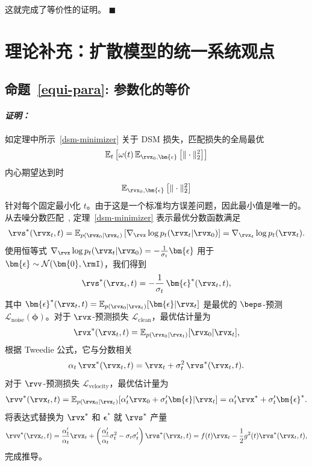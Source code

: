 这就完成了等价性的证明。
\hfill$\blacksquare$


\section{理论补充：扩散模型的统一系统观点}\label{app-sec:equiv-para}

\subsection{命题~\ref{equi-para}: 参数化的等价}

\paragraph{\textit{证明：}}
如定理中所示~\ref{dsm-minimizer} 关于 DSM 损失，匹配损失的全局最优
\[
\mathbb{E}_t\left[\omega(t)\,\mathbb{E}_{\rvx_0,\bm{\epsilon}}\left[\|\cdot\|_2^2\right]\right]
\]
内心期望达到时
\[
\mathbb{E}_{\rvx_0,\bm{\epsilon}}\left[\|\cdot\|_2^2\right]
\]
针对每个固定最小化 $t$。由于这是一个标准均方误差问题，因此最小值是唯一的。从去噪分数匹配~\citep{vincent2011connection}, 定理~\ref{dsm-minimizer} 表示最优分数函数满足
\begin{align*}
    \rvs^*(\rvx_t,t) = \mathbb{E}_{p(\rvx_0|\rvx_t)}\left[\nabla_{\rvx}\log p_t(\rvx_t|\rvx_0)\right] = \nabla_{\rvx_t} \log p_t(\rvx_t).
\end{align*}
使用恒等式 $\nabla_{\rvx}\log p_t(\rvx_t|\rvx_0) = -\frac{1}{\sigma_t} \bm{\epsilon}$ 用于 $\bm{\epsilon} \sim \mathcal{N}(\bm{0},\rmI)$，我们得到
\begin{align*}
    \rvs^*(\rvx_t,t) = -\frac{1}{\sigma_t}\, \bm{\epsilon}^*(\rvx_t,t),
\end{align*}
其中 $\bm{\epsilon}^*(\rvx_t,t) = \mathbb{E}_{p(\rvx_0|\rvx_t)}[\bm{\epsilon}|\rvx_t]$ 是最优的 $\beps$-预测 $\mathcal{L}_{\text{noise}}({\bm{\phi}})$。对于 $\rvx$-预测损失 $\mathcal{L}_{\text{clean}}$，最优估计量为
\[
\rvx^*(\rvx_t,t) = \mathbb{E}_{p(\rvx_0|\rvx_t)}[\rvx_0|\rvx_t],
\]
根据 Tweedie 公式，它与分数相关
\[
\alpha_t\, \rvx^*(\rvx_t,t) = \rvx_t + \sigma_t^2\, \rvs^*(\rvx_t,t).
\]
对于 $\rvv$-预测损失 $\mathcal{L}_{\text{velocity}}$，最优估计量为
\begin{align*}
    \rvv^*(\rvx_t,t) = \mathbb{E}_{p(\rvx_0|\rvx_t)}[\alpha_t' \rvx_0 + \sigma_t' \bm{\epsilon}|\rvx_t]
    = \alpha_t' \rvx^* + \sigma_t' \bm{\epsilon}^*.
\end{align*}
将表达式替换为 $\rvx^*$ 和 $\bm{\epsilon}^*$ 就 $\rvs^*$ 产量
\begin{align*}
    \rvv^*(\rvx_t,t)
    = \frac{\alpha_t'}{\alpha_t} \rvx_t + \left( \frac{\alpha_t'}{\alpha_t} \sigma_t^2 - \sigma_t \sigma_t' \right) \rvs^*(\rvx_t,t) = f(t) \rvx_t - \frac{1}{2}g^2(t) \rvs^*(\rvx_t,t),
\end{align*}
完成推导。


